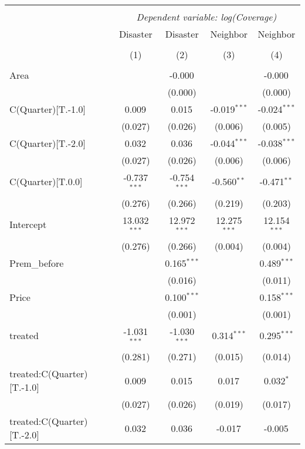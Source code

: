 
\begin{tabular}{@{\extracolsep{5pt}}lcccc}
\\[-1.8ex]\hline
\hline \\[-1.8ex]
& \multicolumn{4}{c}{\textit{Dependent variable: log(Coverage)}} \
\cr \cline{2-5}
\\[-1.8ex] & \multicolumn{1}{c}{Disaster} & \multicolumn{1}{c}{Disaster} & \multicolumn{1}{c}{Neighbor} & \multicolumn{1}{c}{Neighbor}  \\
\\[-1.8ex] & (1) & (2) & (3) & (4) \\
\hline \\[-1.8ex]
 Area & & -0.000$^{}$ & & -0.000$^{}$ \\
& & (0.000) & & (0.000) \\
 C(Quarter)[T.-1.0] & 0.009$^{}$ & 0.015$^{}$ & -0.019$^{***}$ & -0.024$^{***}$ \\
& (0.027) & (0.026) & (0.006) & (0.005) \\
 C(Quarter)[T.-2.0] & 0.032$^{}$ & 0.036$^{}$ & -0.044$^{***}$ & -0.038$^{***}$ \\
& (0.027) & (0.026) & (0.006) & (0.006) \\
 C(Quarter)[T.0.0] & -0.737$^{***}$ & -0.754$^{***}$ & -0.560$^{**}$ & -0.471$^{**}$ \\
& (0.276) & (0.266) & (0.219) & (0.203) \\
 Intercept & 13.032$^{***}$ & 12.972$^{***}$ & 12.275$^{***}$ & 12.154$^{***}$ \\
& (0.276) & (0.266) & (0.004) & (0.004) \\
 Prem\_before & & 0.165$^{***}$ & & 0.489$^{***}$ \\
& & (0.016) & & (0.011) \\
 Price & & 0.100$^{***}$ & & 0.158$^{***}$ \\
& & (0.001) & & (0.001) \\
 treated & -1.031$^{***}$ & -1.030$^{***}$ & 0.314$^{***}$ & 0.295$^{***}$ \\
& (0.281) & (0.271) & (0.015) & (0.014) \\
 treated:C(Quarter)[T.-1.0] & 0.009$^{}$ & 0.015$^{}$ & 0.017$^{}$ & 0.032$^{*}$ \\
& (0.027) & (0.026) & (0.019) & (0.017) \\
 treated:C(Quarter)[T.-2.0] & 0.032$^{}$ & 0.036$^{}$ & -0.017$^{}$ & -0.005$^{}$ \\

\end{tabular}
